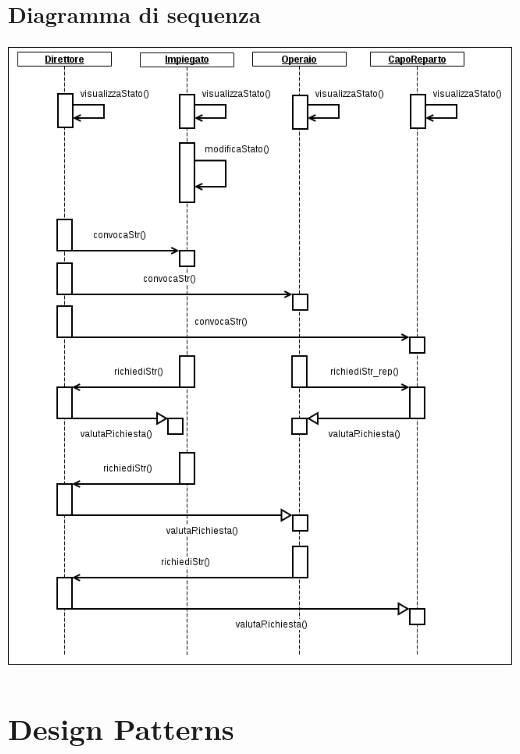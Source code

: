 \documentclass{scrreprt}
\begin{document}

\pagebreak

\section{Diagramma di sequenza}
	{\centering
	\specialcell{\\}
	\includegraphics[scale=0.9]{sequence}\par
	}

\chapter{Design Patterns}
%
\end{document}
